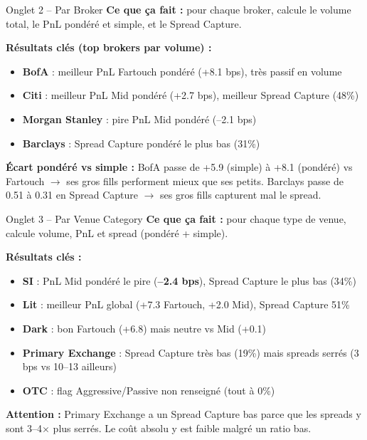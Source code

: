 \documentclass[10pt]{beamer}
\begin{document}
\begin{frame}{Onglet 2 -- Par Broker}
\textbf{Ce que ça fait :} pour chaque broker, calcule le volume total, le PnL pondéré et simple, et le Spread Capture.

\vspace{0.2cm}
\textbf{Résultats clés (top brokers par volume) :}
\begin{itemize}
    \item \textbf{BofA} : meilleur PnL Fartouch pondéré (+8.1 bps), très passif en volume
    \item \textbf{Citi} : meilleur PnL Mid pondéré (+2.7 bps), meilleur Spread Capture (48\%)
    \item \textbf{Morgan Stanley} : pire PnL Mid pondéré (--2.1 bps)
    \item \textbf{Barclays} : Spread Capture pondéré le plus bas (31\%)
\end{itemize}

\vspace{0.2cm}
\textbf{Écart pondéré vs simple :} BofA passe de +5.9 (simple) à +8.1 (pondéré) vs Fartouch $\rightarrow$ ses gros fills performent mieux que ses petits. Barclays passe de 0.51 à 0.31 en Spread Capture $\rightarrow$ ses gros fills capturent mal le spread.
\end{frame}

\begin{frame}{Onglet 3 -- Par Venue Category}
\textbf{Ce que ça fait :} pour chaque type de venue, calcule volume, PnL et spread (pondéré + simple).

\vspace{0.2cm}
\textbf{Résultats clés :}
\begin{itemize}
    \item \textbf{SI} : PnL Mid pondéré le pire (\textbf{--2.4 bps}), Spread Capture le plus bas (34\%)
    \item \textbf{Lit} : meilleur PnL global (+7.3 Fartouch, +2.0 Mid), Spread Capture 51\%
    \item \textbf{Dark} : bon Fartouch (+6.8) mais neutre vs Mid (+0.1)
    \item \textbf{Primary Exchange} : Spread Capture très bas (19\%) mais spreads serrés (3 bps vs 10--13 ailleurs)
    \item \textbf{OTC} : flag Aggressive/Passive non renseigné (tout à 0\%)
\end{itemize}

\vspace{0.2cm}
\textbf{Attention :} Primary Exchange a un Spread Capture bas parce que les spreads y sont 3--4$\times$ plus serrés. Le coût absolu y est faible malgré un ratio bas.
\end{frame}
\end{document}

